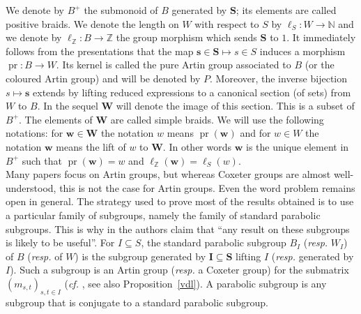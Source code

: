 \documentclass{amsart}
\numberwithin{equation}{section}
\newcommand\lZ{{\ell_{\BZ}}}
\newcommand\bs{{\mathbf s}}
\newcommand\bw{{\mathbf w}}
\newcommand\bI{{\mathbf I}}
\newcommand\bS{{\mathbf S}}
\newcommand\bW{{\mathbf W}}
\newcommand\BN{{\mathbb N}}
\newcommand\BZ{{\mathbb Z}}
\DeclareMathOperator\pr{pr}
\begin{document}
We  denote by  $B^+$ the submonoid of  $B$ generated by $\bS$; its elements are
called positive braids. We denote the length on $W$ with respect to $S$
by $\ell_S : W \to \BN$  \index{lZ@$\lZ$}
and we denote by $\lZ: B\to\BZ$ the group morphism which sends $\bS$ to
$1$.
It immediately follows
from the presentations that the map $\bs\in \bS \mapsto s\in S$ induces a
morphism  \index{pr@$\pr$} $\pr: B \to W$. Its kernel is called the
pure Artin group  associated to $B$
(or the coloured Artin group) and will be denoted by $P$. Moreover, the inverse
bijection $s\mapsto \bs$ extends by lifting reduced expressions 
to a canonical  section (of sets) from $W$ to $B$.
In the sequel \index{W@$\bW$} $\bW$ will denote  the image of this section. This is a subset
of $B^+$. The elements of $\bW$ are called simple braids. We will use the
following notations: for \index{w@$\bw, w$} $\bw\in\bW$ the notation $w$ means $\pr(\bw)$
and for $w\in W$ the notation $\bw$ means the lift of $w$ to $\bW$. In other words
$\bw$ is the unique element in $B^+$ such that $\pr(\bw) = w$ and $\lZ(\bw)
= \ell_S(w)$. \\

Many papers focus on Artin groups, but whereas Coxeter groups are almost
well-understood,  this is not the case for Artin groups. Even the word problem
remains open in general. The strategy used to prove most of the results
obtained is to use a particular family of subgroups, namely the family of
standard  parabolic subgroups. This is why in \cite{Charney-Paris} the authors
claim that ``any result on these subgroups is likely to be useful''. For $I\subseteq S$,
the standard  parabolic  subgroup  $B_I$  (\emph{resp.}  $W_I$)  of $B$
    (\emph{resp.}  of  $W$)  is the
subgroup generated by $\bI\subseteq\bS$ lifting
$I$ (\emph{resp.} generated  by $I$). Such  a subgroup is an Artin
group  (\emph{resp.} a Coxeter group) for the submatrix $(m_{s,t})_{s,t\in I}$
(\emph{cf.}  \cite{VanderLek}, see also Proposition~\ref{vdl}).
A parabolic subgroup is any subgroup that is
conjugate to a standard parabolic subgroup.
\end{document}
